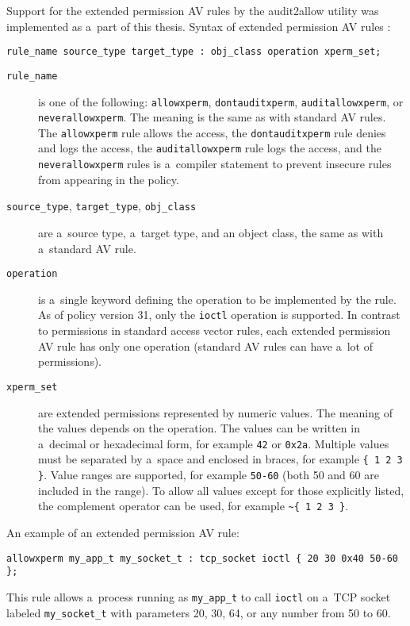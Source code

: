 Support for the extended permission AV rules by the audit2allow utility was
implemented as a~part of this thesis. Syntax of extended permission AV rules
\cite{xpermrules}:
\begin{lstlisting}[language=te]
rule_name source_type target_type : obj_class operation xperm_set;
\end{lstlisting}
\begin{description}
    \item [\texttt{rule\_name}] is one of the following: \texttt{allowxperm},
        \texttt{dontauditxperm}, \texttt{auditallowxperm}, or
        \texttt{neverallowxperm}. The meaning is the same as with standard AV
        rules. The \texttt{allow\-xperm} rule allows the access, the
        \texttt{dontauditxperm} rule denies and logs the access, the
        \texttt{auditallowxperm} rule logs the access, and the
        \texttt{neverallowxperm} rules is a~compiler statement to prevent
        insecure rules from appearing in the policy.
    \item [\texttt{source\_type}, \texttt{target\_type}, \texttt{obj\_class}]
        are a~source type, a~target type, and an object class, the same as with
        a~standard AV rule.
    \item [\texttt{operation}] is a~single keyword defining the operation to be
        implemented by the rule. As of policy version 31, only the
        \texttt{ioctl} operation is supported. In contrast to permissions in
        standard access vector rules, each extended permission AV rule has only
        one operation (standard AV rules can have a~lot of permissions).
    \item [\texttt{xperm\_set}] are extended permissions represented by numeric
        values. The meaning of the values depends on the operation. The values
        can be written in a~decimal or hexadecimal form, for example \texttt{42}
        or \texttt{0x2a}. Multiple values must be separated by a~space and
        enclosed in braces, for example \texttt{\{ 1 2 3 \}}. Value ranges are
        supported, for example \texttt{50-60} (both 50 and 60 are included in
        the range).  To allow all values except for those explicitly listed, the
        complement operator can be used, for example
        \texttt{\textasciitilde \{ 1 2 3 \}}.
\end{description}

An example of an extended permission AV rule:
\begin{lstlisting}[language=te]
allowxperm my_app_t my_socket_t : tcp_socket ioctl { 20 30 0x40 50-60 };
\end{lstlisting}
This rule allows a~process running as \texttt{my\_app\_t} to call \texttt{ioctl}
on a~TCP socket labeled \texttt{my\_socket\_t} with parameters 20, 30, 64, or
any number from 50 to 60.

